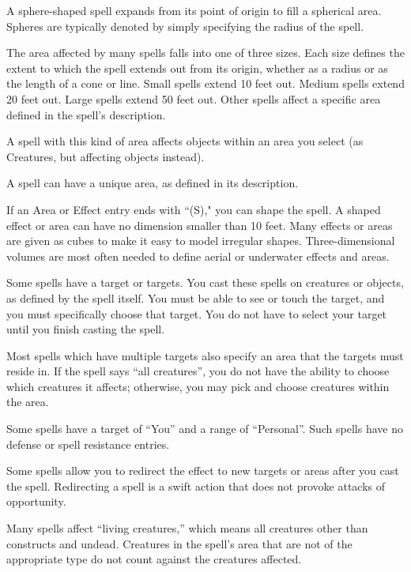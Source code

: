 A sphere-shaped spell expands from its point of origin to fill a spherical area. Spheres are typically denoted by simply specifying the radius of the spell.

 The area affected by many spells falls into one of three sizes. Each size defines the extent to which the spell extends out from its origin, whether as a radius or as the length of a cone or line. Small spells extend 10 feet out. Medium spells extend 20 feet out. Large spells extend 50 feet out. Other spells affect a specific area defined in the spell's description.

 A spell with this kind of area affects objects within an area you select (as Creatures, but affecting objects instead).

 A spell can have a unique area, as defined in its description.

 If an Area or Effect entry ends with ``(S)," you can shape the spell. A shaped effect or area can have no dimension smaller than 10 feet. Many effects or areas are given as cubes to make it easy to model irregular shapes. Three-dimensional volumes are most often needed to define aerial or underwater effects and areas.

 Some spells have a target or targets. You cast these spells on creatures or objects, as defined by the spell itself. You must be able to see or touch the target, and you must specifically choose that target. You do not have to select your target until you finish casting the spell.

 Most spells which have multiple targets also specify an area that the targets must reside in. If the spell says ``all creatures'', you do not have the ability to choose which creatures it affects; otherwise, you may pick and choose creatures within the area.

 Some spells have a target of ``You'' and a range of ``Personal''. Such spells have no defense or spell resistance entries.

 Some spells allow you to redirect the effect to new targets or areas after you cast the spell. Redirecting a spell is a swift action that does not provoke attacks of opportunity.

 Many spells affect ``living creatures,'' which means all creatures other than constructs and undead. Creatures in the spell's area that are not of the appropriate type do not count against the creatures affected.

